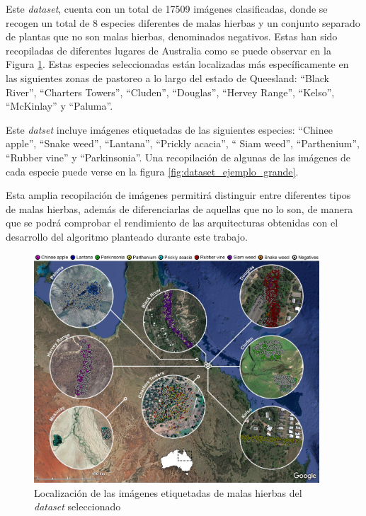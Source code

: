 Este \textit{dataset}, cuenta con un total de 17509 imágenes clasificadas, donde se recogen un total de 8 especies diferentes de malas hierbas y un conjunto separado de plantas que no son malas hierbas, denominados negativos. Estas han sido recopiladas de diferentes lugares de Australia como se puede observar en la Figura \ref{fig:loc_malas_hierbas}. Estas especies seleccionadas están localizadas más específicamente en las siguientes zonas de pastoreo a lo largo del estado de Queesland: ``Black River'', ``Charters Towers'', ``Cluden'', ``Douglas'', ``Hervey Range'', ``Kelso'', ``McKinlay'' y ``Paluma''.

Este \textit{datset} incluye imágenes etiquetadas de las siguientes especies: ``Chinee apple'', ``Snake weed'', ``Lantana'', ``Prickly acacia'', `` Siam weed'', ``Parthenium'', ``Rubber vine'' y ``Parkinsonia''. Una recopilación de algunas de las imágenes de cada especie puede verse en la figura \ref{fig:dataset_ejemplo_grande}.

Esta amplia recopilación de imágenes permitirá distinguir entre diferentes tipos de malas hierbas, además de diferenciarlas de aquellas que no lo son, de manera que se podrá comprobar el rendimiento de las arquitecturas obtenidas con el desarrollo del algoritmo planteado durante este trabajo.

\begin{figure}[h]
    \centering
    \includegraphics[width=0.95\textwidth]{figuras/problema/localizacion_malas_hierbas.jpg}
    \caption{Localización de las imágenes etiquetadas de malas hierbas del \textit{dataset} seleccionado \cite{Olsen2019}}
    \label{fig:loc_malas_hierbas}
\end{figure}

